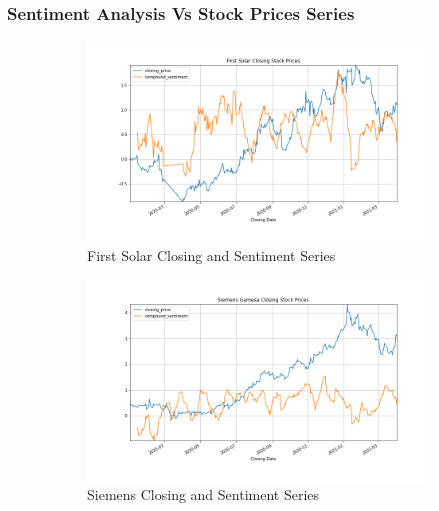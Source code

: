 \documentclass[sigconf, nonacm]{acmart}
\begin{document}
\subsubsection{Sentiment Analysis  Vs Stock Prices Series} 
\begin{figure}[H]
\centering
   \begin{subfigure}[b]{0.5\textwidth}
   \includegraphics[width=\textwidth]{sentiment_time_series/First Solar Closing Stock Prices_closing_price_compound_sentiment.png} 
   \caption{First Solar Closing and Sentiment Series}
   \label{fig:Ng1} 
\end{subfigure}
\centering
   \begin{subfigure}[b]{0.5\textwidth}
   \includegraphics[width=\textwidth]{sentiment_time_series/Siemens Gamesa Closing Stock Prices_closing_price_compound_sentiment.png} 
   \caption{Siemens Closing and Sentiment Series}
   \label{fig:Ng1} 
\end{subfigure}
\centering
   \begin{subfigure}[b]{0.5\textwidth}

\end{subfigure}
\end{figure}
\end{document}
